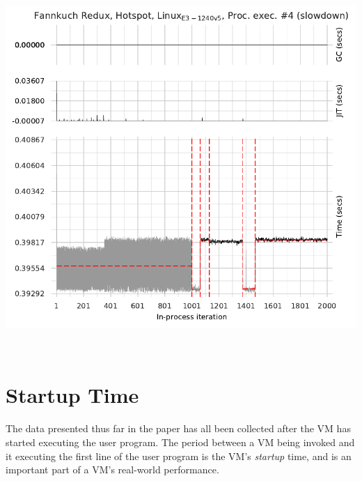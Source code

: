 \documentclass[acmsmall]{acmart}\settopmatter{printfolios=true}
\begin{document}
\begin{table}[t]
\begin{minipage}[t]{0.485\textwidth}%
\vspace{0pt}
\centering
\includegraphics[width=\textwidth]{examples/unexplained_weirdness.pdf}
\end{minipage}
\hfill
\begin{minipage}[t]{0.485\textwidth}
\vspace{0pt}
\centering

\end{minipage}
\\
\begin{minipage}[t]{0.485\textwidth}
\vspace{-\baselineskip}
\centering
{}
\label{fig:unexplained}
\end{minipage}
\hfill
\begin{minipage}[t]{0.485\textwidth}
\vspace{0pt}
\centering
{}
\label{fig:startup}
\end{minipage}
\end{table}


\section{Startup Time}
\label{sec:startup}
The data presented thus far in the paper has all been collected after the VM has
started executing the user program. The period between a VM being
invoked and it executing the first line of the user program is the VM's \emph{startup} time,
and is an important part of a VM's real-world performance.
\end{document}
